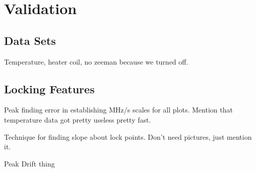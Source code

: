 \newpage
\section{Validation}
\label{sec:validation}

\subsection{Data Sets}

Temperature, heater coil, no zeeman because we turned off.

\subsection{Locking Features}

Peak finding error in establishing MHz/s scales for all plots. Mention that temperature data got pretty useless pretty fast.

Technique for finding slope about lock points. Don't need pictures, just mention it.

Peak Drift thing
